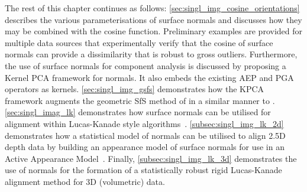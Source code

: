 The rest of this chapter continues as follows:
\cref{sec:singl_img_cosine_orientations} describes the various
parameterisations of surface normals and discusses how they may be combined with
the cosine function. Preliminary examples are provided for multiple
data sources that experimentally verify that the cosine of surface normals
can provide a dissimilarity that is robust to gross outliers. Furthermore,
the use of surface normals for component analysis is discussed by proposing a
Kernel PCA framework for normals. It also embeds the existing AEP and PGA
operators as kernels.
\cref{sec:singl_img_gsfs} demonstrates how the KPCA framework augments
the geometric SfS method of \citet{worthington1999new} in a similar manner to
\citet{smith2006recovering}.
\cref{sec:singl_imag_lk} demonstrates how surface
normals can be utilised for alignment within Lucas-Kanade style
algorithms~\cite{lucas1981iterative}.
\cref{subsec:singl_img_lk_2d} demonstrates how a statistical model of normals
can be utilised to align 2.5D depth data by building an appearance model of
surface normals for use in an Active Appearance Model~\cite{cootes2001active}.
Finally, \cref{subsec:singl_img_lk_3d} demonstrates the use of normals for the
formation of a statistically robust rigid Lucas-Kanade~\cite{lucas1981iterative}
alignment method for 3D (volumetric) data.
{






}
\stopcontents[chapters]

